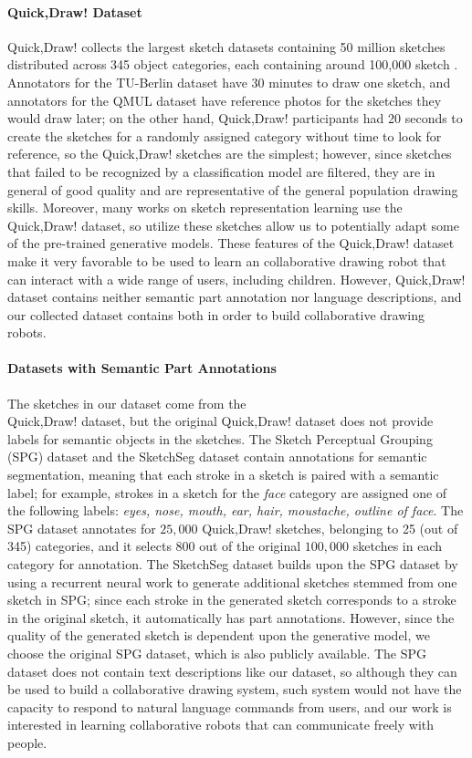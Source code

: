 \paragraph{Quick,Draw! Dataset}
Quick,Draw! collects the largest sketch datasets containing 50 million sketches distributed across 345 object categories, each containing around 100,000 sketch \citep{ha2017neural}. Annotators for the TU-Berlin dataset have 30 minutes to draw one sketch, and annotators for the QMUL dataset have reference photos for the sketches they would draw later; on the other hand, Quick,Draw! participants had 20 seconds to create the sketches for a randomly assigned category without time to look for reference, so the Quick,Draw! sketches are the simplest; however, since sketches that failed to be recognized by a classification model are filtered, they are in general of good quality and are representative of the general population drawing skills. Moreover, many works on sketch representation learning use the Quick,Draw! dataset, so utilize these sketches allow us to potentially adapt some of the pre-trained generative models. 
These features of the Quick,Draw! dataset make it very favorable to be used to learn an collaborative drawing robot that can interact with a wide range of users, including children. However, Quick,Draw! dataset contains neither semantic part annotation nor language descriptions, and our collected dataset contains both in order to build collaborative drawing robots.   

\paragraph{Datasets with Semantic Part Annotations}
The sketches in our dataset come from the \\
Quick,Draw! dataset, but the original Quick,Draw! dataset does not provide labels for semantic objects in the sketches. 
The Sketch Perceptual Grouping (SPG) dataset \citep{spg_paper} and the SketchSeg dataset \citep{sketchsegDataset} contain annotations for semantic segmentation, meaning that each stroke in a sketch is paired with a semantic label; for example, strokes in a sketch for the \textit{face} category are assigned one of the following labels: \textit{eyes, nose, mouth, ear, hair, moustache, outline of face}. 
The SPG dataset annotates for $25,000$ Quick,Draw! sketches, belonging to 25 (out of 345) categories, and it selects 800 out of the original $100,000$ sketches in each category for annotation. 
The SketchSeg dataset builds upon the SPG dataset by using a recurrent neural work to generate additional sketches stemmed from one sketch in SPG; since each stroke in the generated sketch corresponds to a stroke in the original sketch, it automatically has part annotations. However, since the quality of the generated sketch is dependent upon the generative model, we choose the original SPG dataset, which is also publicly available. The SPG dataset does not contain text descriptions like our dataset, so although they can be used to build a collaborative drawing system, such system would not have the capacity to respond to natural language commands from users, and our work is interested in learning collaborative robots that can communicate freely with people.    

